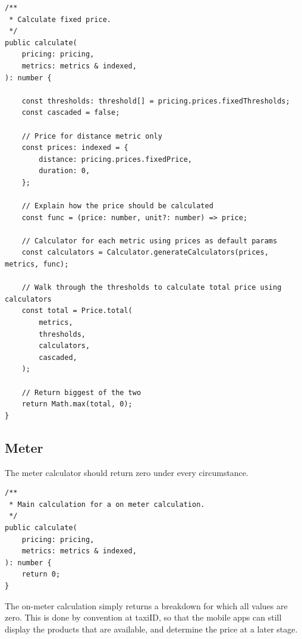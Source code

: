 \begin{center}
\noindent\begin{minipage}{.85\textwidth}
\begin{lstlisting}[caption={Fixed calculation.}, label={lst:fixed-calculation}]
/**
 * Calculate fixed price.
 */
public calculate(
	pricing: pricing,
	metrics: metrics & indexed,
): number {

	const thresholds: threshold[] = pricing.prices.fixedThresholds;
	const cascaded = false;

	// Price for distance metric only
	const prices: indexed = {
		distance: pricing.prices.fixedPrice,
		duration: 0,
	};

	// Explain how the price should be calculated
	const func = (price: number, unit?: number) => price;

	// Calculator for each metric using prices as default params
	const calculators = Calculator.generateCalculators(prices, metrics, func);

	// Walk through the thresholds to calculate total price using calculators
	const total = Price.total(
		metrics,
		thresholds,
		calculators,
		cascaded,
	);

	// Return biggest of the two
	return Math.max(total, 0);
}
\end{lstlisting}
\end{minipage}
\end{center}

\subsection{Meter}
The meter calculator should return zero under every circumstance.

\begin{center}
\noindent\begin{minipage}{.85\textwidth}
\begin{lstlisting}[caption={Meter calculation.}, label={lst:meter-calculation}]
/**
 * Main calculation for a on meter calculation.
 */
public calculate(
	pricing: pricing,
	metrics: metrics & indexed,
): number {
	return 0;
}
\end{lstlisting}
\end{minipage}
\end{center}

The on-meter calculation simply returns a breakdown for which all values are zero. This is done by convention at taxiID, so that the mobile apps can still display the products that are available, and determine the price at a later stage.


